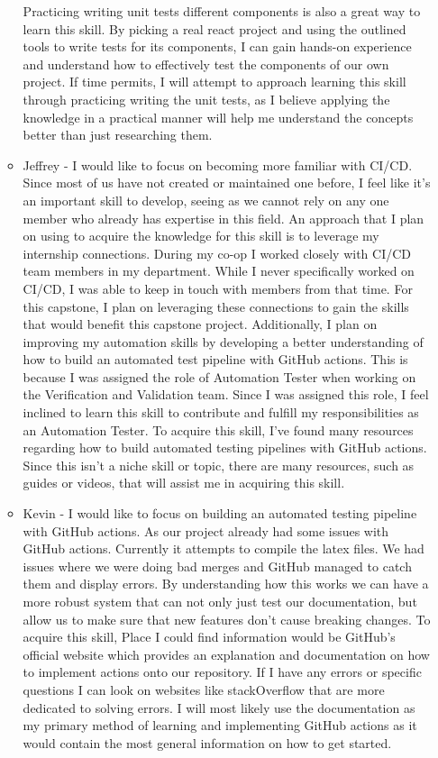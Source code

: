 \documentclass[12pt, titlepage]{article}
\begin{document}
\begin{enumerate}
\begin{itemize}
    Practicing writing unit tests different components is also a great way to
    learn this skill. By picking a real react project and using the outlined
    tools to write tests for its components, I can gain hands-on experience
    and understand how to effectively test the components of our own project.
    If time permits, I will attempt to approach learning this skill through
    practicing writing the unit tests, as I believe applying the knowledge in a
    practical manner will help me understand the concepts better than just
    researching them.
    \item Jeffrey - I would like to focus on becoming more
    familiar with CI/CD. Since most of us have not created or
    maintained one before, I feel like it's an important
    skill to develop, seeing as we cannot rely on any
    one member who already has expertise in this field. An approach
    that I plan on using to acquire the knowledge for this
    skill is to leverage my internship connections. During my co-op
    I worked closely with CI/CD team members in my department.
    While I never specifically worked on CI/CD, I was able to keep
    in touch with members from that time. For this capstone, I plan
    on leveraging these connections to gain the skills
    that would benefit this capstone project. Additionally, I plan
    on improving my automation skills by developing a better
    understanding of how to build an automated test pipeline with
    GitHub actions. This is because I was assigned the role of
    Automation Tester when working on the Verification and
    Validation team. Since I was assigned this role,
    I feel inclined to learn this skill to contribute and fulfill
    my responsibilities as an Automation Tester. To acquire this
    skill, I've found many resources regarding how to build
    automated testing pipelines with GitHub actions. Since this
    isn't a niche skill or topic, there are many resources, such as
    guides or videos, that will assist me in acquiring this skill.
    \item Kevin - I would like to focus on building an automated testing pipeline
     with GitHub actions. As our project already had some issues with GitHub
      actions. Currently it attempts to compile the latex files. We had issues 
      where we were doing bad merges and GitHub managed to catch them and display
       errors. By understanding how this works we can have a more robust system 
       that can not only just test our documentation, but allow us to make sure 
       that new features don't cause breaking changes. To acquire this skill, 
       Place I could find information would be GitHub's official website which
       provides an explanation and documentation on how to implement actions onto
       our repository. If I have any errors or specific questions I can look on 
       websites like stackOverflow that are more dedicated to solving errors.  
       I will most likely use the documentation as my primary method of learning 
       and implementing GitHub actions as it would contain the most general 
       information on how to get started.
  \end{itemize}
\end{enumerate}
\end{document}
